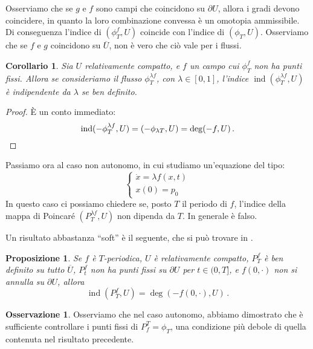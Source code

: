 \documentclass[a4paper, 11pt]{article}
\theoremstyle{definition}
\newtheorem*{Oss}{Osservazione}
\theoremstyle{plain}
\newtheorem{Prop}[Def]{Proposizione}
\newtheorem{Cor}[Def]{Corollario}
\newcommand{\cl}[1]{\overline{#1}}
\DeclareMathOperator{\ind}{ind}
\begin{document}
Osserviamo che se $g$ e $f$ sono campi che coincidono su $\partial U$, allora i gradi devono coincidere, in quanto la loro combinazione convessa è un omotopia ammissibile. Di conseguenza l'indice di $(\phi_T^f,U)$ coincide con l'indice di $(\phi_T, U)$. Osserviamo che se $f$ e $g$ coincidono su $\cl{U}$, non è vero che ciò vale per i flussi.
\begin{Cor}\label{Cor:costantelambda}
	Sia $U$ relativamente compatto, e $f$ un campo cui $\phi_T^f$ non ha punti fissi. Allora se consideriamo il flusso $\phi_T^{\lambda f}$, con $\lambda \in [0,1]$, l'indice $\ind(\phi_T^{\lambda f}, U)$ è indipendente da $\lambda$ se ben definito.
\end{Cor}
\begin{proof}
	È un conto immediato:
	\[
		\ind(-\phi_T^{\lambda f}, U) = (-\phi_{\lambda T}, U) = \deg(-f,U)\,.\qedhere
	\]
\end{proof}

Passiamo ora al caso non autonomo, in cui studiamo un'equazione del tipo:
\[
	\begin{cases}
		\dot{x} = \lambda f(x,t) \\
		x(0) = p_0
	\end{cases}
\]
In questo caso ci possiamo chiedere se, posto $T$ il periodo di $f$, l'indice della mappa di Poincaré $(P^{\lambda f}_T, U)$ non dipenda da $T$. In generale è falso.

Un risultato abbastanza ``soft'' è il seguente, che si può trovare in \cite{Krasnoselskii1968}.
\begin{Prop}\label{prop:tirrever}
	Se $f$ è $T$-periodica, $U$ è relativamente compatto, $P^f_T$ è ben definito su tutto $\cl{U}$, $P^f_t$ non ha punti fissi su $\partial U$ per $t \in (0,T]$, e $f(0,\cdot)$ non si annulla su $\partial U$, allora
	\[
		\ind(P^f_T, U) = \deg(-f(0,\cdot), U)\,.
	\]
\end{Prop}

\begin{Oss}
	Osserviamo che nel caso autonomo, abbiamo dimostrato che è sufficiente controllare i punti fissi di $P_f^T = \phi_T$, una condizione più debole di quella contenuta nel risultato precedente.
\end{Oss}
\end{document}
